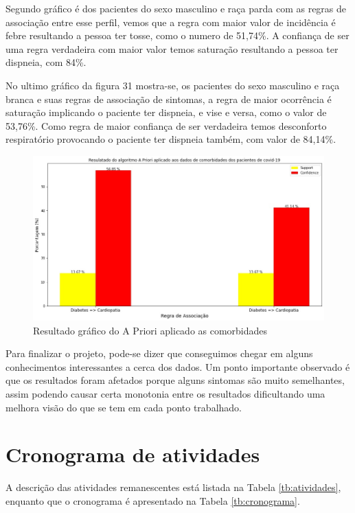 \documentclass[tcc1]{uftex}
\begin{document}
    Segundo gráfico é dos pacientes do sexo masculino e raça parda com as regras de associação entre esse perfil, vemos que a regra com maior valor de incidência é febre resultando a pessoa ter tosse, como o numero de 51,74\%. A confiança de ser uma regra verdadeira com maior valor temos saturação resultando a pessoa ter dispneia, com 84\%.
    
    No ultimo gráfico da figura 31 mostra-se, os pacientes do sexo masculino e raça branca e suas regras de associação de sintomas, a regra de maior ocorrência é saturação implicando o paciente ter dispneia, e vise e versa, como o valor de 53,76\%. Como regra de maior confiança de ser verdadeira temos desconforto respiratório provocando o paciente ter dispneia também, com valor de 84,14\%.
    
    
    \begin{figure}[!h]
    \centering
    \includegraphics[width=14cm]{AprioriIMG_Comorbidades_nova.jpg}
    \caption{Resultado gráfico do A Priori aplicado as comorbidades}
    \end{figure}
    
    
    Para finalizar o projeto, pode-se dizer que conseguimos chegar em alguns conhecimentos interessantes a cerca dos dados. Um ponto importante observado é que os resultados foram afetados porque alguns sintomas são muito semelhantes, assim podendo causar certa monotonia entre os resultados dificultando uma melhora visão do que se tem em cada ponto trabalhado.

\chapter{Cronograma de atividades}
A descrição das atividades remanescentes está listada na Tabela \ref{tb:atividades}, enquanto que o cronograma é apresentado na Tabela \ref{tb:cronograma}.
\end{document}
